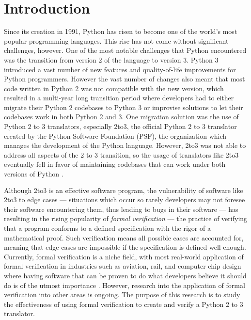 \section{Introduction}
Since its creation in 1991, Python has risen to become one of the world's most popular programming languages. This rise has not come without significant challenges, however. One of the most notable challenges that Python encountered was the transition from version 2 of the language to version 3. Python 3 introduced a vast number of new features and quality-of-life improvements for Python programmers. However the vast number of changes also meant that most code written in Python 2 was not compatible with the new version, which resulted in a multi-year long transition period where developers had to either migrate their Python 2 codebases to Python 3 or improvise solutions to let their codebases work in both Python 2 and 3. One migration solution was the use of Python 2 to 3 translators, especially 2to3, the official Python 2 to 3 translator created by the Python Software Foundation (PSF), the organization which manages the development of the Python language. However, 2to3 was not able to address all aspects of the 2 to 3 transition, so the usage of translators like 2to3 eventually fell in favor of maintaining codebases that can work under both versions of Python \autocite{Malloy}.

Although 2to3 is an effective software program, the vulnerability of software like 2to3 to edge cases --- situations which occur so rarely developers may not foresee their software encountering them, thus leading to bugs in their software --- has resulting in the rising popularity of \textit{formal verification} --- the practice of verifying that a program conforms to a defined specification with the rigor of a mathematical proof. Such verification means all possible cases are accounted for, meaning that edge cases are impossible if the specification is defined well enough. Currently, formal verification is a niche field, with most real-world application of formal verification in industries such as aviation, rail, and computer chip design where having software that can be proven to do what developers believe it should do is of the utmost importance \autocite{Woodcock}. However, research into the application of formal verification into other areas is ongoing. The purpose of this research is to study the effectiveness of using formal verification to create and verify a Python 2 to 3 translator.
